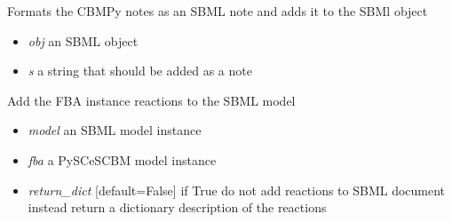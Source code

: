 \documentclass[a4paper,11pt,english]{sphinxmanual}
\begin{document}
\begin{fulllineitems}
\label{modules_doc:cbmpy.CBXML.sbml_setNotes3}
Formats the CBMPy notes as an SBML note and adds it to the SBMl object
\begin{itemize}
\item {} 
\emph{obj} an SBML object

\item {} 
\emph{s} a string that should be added as a note

\end{itemize}

\end{fulllineitems}


\begin{fulllineitems}
\label{modules_doc:cbmpy.CBXML.sbml_setReactionsL2}
Add the FBA instance reactions to the SBML model
\begin{itemize}
\item {} 
\emph{model} an SBML model instance

\item {} 
\emph{fba} a PySCeSCBM model instance

\item {} 
\emph{return\_dict} {[}default=False{]} if True do not add reactions to SBML document instead return a dictionary description of the reactions

\end{itemize}

\end{fulllineitems}

\end{document}
